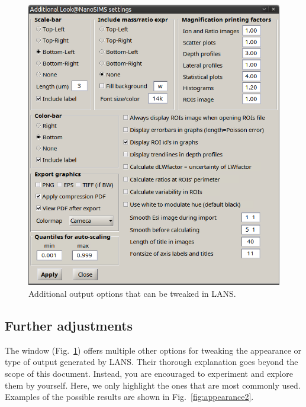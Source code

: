 \begin{figure}[!t]
\centering
\includegraphics[scale=0.5]{figs1/LANS-tweaking}
\caption{\label{fig:appearance}%
Additional output options that can be tweaked in LANS.}
\end{figure}

\subsection{Further adjustments}
\label{sec:appearance1}

\goldbox{}
The  window (Fig.~\ref{fig:appearance}) offers multiple other options for tweaking the appearance or type of output generated by LANS. Their thorough explanation goes beyond the scope of this document. Instead, you are encouraged to experiment and explore them by yourself. Here, we only highlight the ones that are most commonly used. Examples of the possible results are shown in Fig.~\ref{fig:appearance2}.
\tcbe


